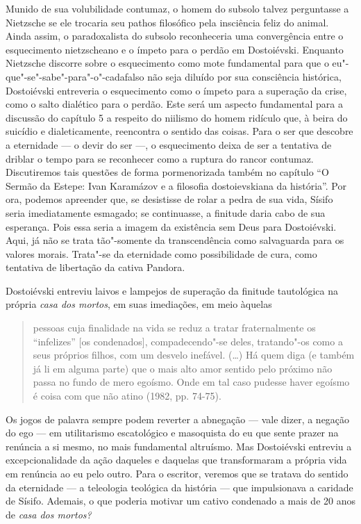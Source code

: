 Munido de sua volubilidade contumaz, o homem do subsolo talvez
perguntasse a Nietzsche se ele trocaria seu pathos filosófico pela
insciência feliz do animal. Ainda assim, o paradoxalista do subsolo
reconheceria uma convergência entre o esquecimento nietzscheano e o
ímpeto para o perdão em Dostoiévski. Enquanto Nietzsche discorre sobre o
esquecimento como mote fundamental para que o
eu"-que"-se"-sabe"-para"-o"-cadafalso não seja diluído por sua consciência
histórica, Dostoiévski entreveria o esquecimento como o ímpeto para a
superação da crise, como o salto dialético para o perdão. Este será um
aspecto fundamental para a discussão do capítulo 5 a respeito do
niilismo do homem ridículo que, à beira do suicídio e dialeticamente,
reencontra o sentido das coisas. Para o ser que descobre a eternidade ---
o devir do ser ---, o esquecimento deixa de ser a tentativa de driblar o
tempo para se reconhecer como a ruptura do rancor contumaz. Discutiremos
tais questões de forma pormenorizada também no capítulo ``O Sermão da
Estepe: Ivan Karamázov e a filosofia dostoievskiana da história''. Por
ora, podemos apreender que, se desistisse de rolar a pedra de sua vida,
Sísifo seria imediatamente esmagado; se continuasse, a finitude daria
cabo de sua esperança. Pois essa seria a imagem da existência sem Deus
para Dostoiévski. Aqui, já não se trata tão"-somente da transcendência
como salvaguarda para os valores morais. Trata"-se da eternidade como
possibilidade de cura, como tentativa de libertação da cativa Pandora.

Dostoiévski entreviu laivos e lampejos de superação da finitude
tautológica na própria \emph{casa dos mortos}, em suas imediações, em
meio àquelas

\begin{quote}
pessoas cuja finalidade na vida se reduz a tratar fraternalmente os
``infelizes'' {[}os condenados{]}, compadecendo"-se deles, tratando"-os
como a seus próprios filhos, com um desvelo inefável. (\ldots) Há quem diga
(e também já li em alguma parte) que o mais alto amor sentido pelo
próximo não passa no fundo de mero egoísmo. Onde em tal caso pudesse
haver egoísmo é coisa com que não atino (1982, pp. 74-75).
\end{quote}

Os jogos de palavra sempre podem reverter a abnegação --- vale dizer, a
negação do ego --- em utilitarismo escatológico e masoquista do eu que
sente prazer na renúncia a si mesmo, no mais fundamental altruísmo. Mas
Dostoiévski entreviu a excepcionalidade da ação daqueles e daquelas que
transformaram a própria vida em renúncia ao eu pelo outro. Para o
escritor, veremos que se tratava do sentido da eternidade --- a
teleologia teológica da história --- que impulsionava a caridade de
Sísifo. Ademais, o que poderia motivar um cativo condenado a mais de 20
anos de \emph{casa dos mortos? }

